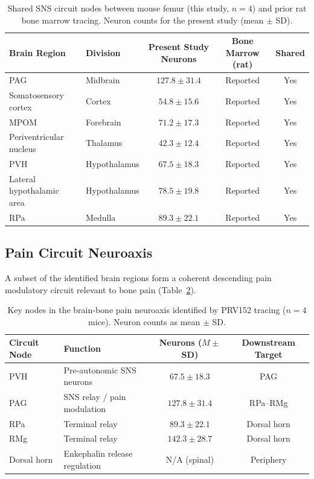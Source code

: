 \documentclass[11pt]{article}
\begin{document}
\begin{table}[H]
\centering
\caption{Shared SNS circuit nodes between mouse femur (this study, $n = 4$) and prior rat bone marrow tracing. Neuron counts for the present study (mean $\pm$ SD).}
\label{tab:comparison}
\begin{tabular}{llccc}
\toprule
Brain Region & Division & Present Study Neurons & Bone Marrow (rat) & Shared \\
\midrule
PAG & Midbrain & $127.8 \pm 31.4$ & Reported & Yes \\
Somatosensory cortex & Cortex & $54.8 \pm 15.6$ & Reported & Yes \\
MPOM & Forebrain & $71.2 \pm 17.3$ & Reported & Yes \\
Periventricular nucleus & Thalamus & $42.3 \pm 12.4$ & Reported & Yes \\
PVH & Hypothalamus & $67.5 \pm 18.3$ & Reported & Yes \\
Lateral hypothalamic area & Hypothalamus & $78.5 \pm 19.8$ & Reported & Yes \\
RPa & Medulla & $89.3 \pm 22.1$ & Reported & Yes \\
\bottomrule
\end{tabular}
\end{table}

\subsection{Pain Circuit Neuroaxis}

A subset of the identified brain regions form a coherent descending pain modulatory circuit relevant to bone pain (Table~\ref{tab:pain}).

\begin{table}[H]
\centering
\caption{Key nodes in the brain-bone pain neuroaxis identified by PRV152 tracing ($n = 4$ mice). Neuron counts as mean $\pm$ SD.}
\label{tab:pain}
\begin{tabular}{llcc}
\toprule
Circuit Node & Function & Neurons ($M \pm$ SD) & Downstream Target \\
\midrule
PVH & Pre-autonomic SNS neurons & $67.5 \pm 18.3$ & PAG \\
PAG & SNS relay / pain modulation & $127.8 \pm 31.4$ & RPa--RMg \\
RPa & Terminal relay & $89.3 \pm 22.1$ & Dorsal horn \\
RMg & Terminal relay & $142.3 \pm 28.7$ & Dorsal horn \\
Dorsal horn & Enkephalin release regulation & N/A (spinal) & Periphery \\
\bottomrule
\end{tabular}
\end{table}
\end{document}
